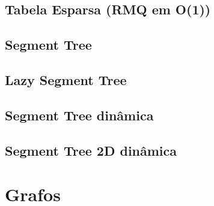 \subsection{Tabela Esparsa (RMQ em O(1))}


\subsection{Segment Tree}


\subsection{Lazy Segment Tree}


\subsection{Segment Tree dinâmica}


\subsection{Segment Tree 2D dinâmica}


% 

% 

% 


\section{Grafos}

